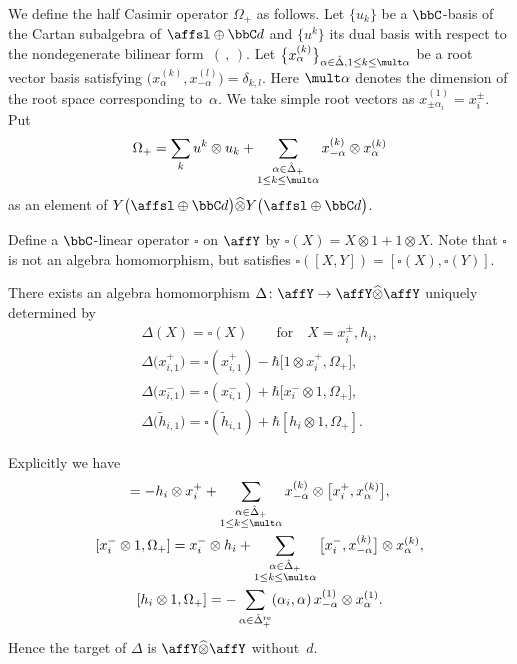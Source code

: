 We define the half Casimir operator $\Omega_+$ as follows. Let $\{u_k\}$ be a $\bbC$-basis of the Cartan subalgebra of $\affsl \oplus \bbC d$ and $\big\{u^k\big\}$ its dual basis with respect to the nondegenerate bilinear form~$(\, ,\, )$. Let $\big\{x_{\alpha}^{(k)}\big\}_{\alpha \in \hat{\Delta}, 1 \leq k \leq \mult \alpha}$ be a root vector basis satisfying $\big(x_{\alpha}^{(k)},x_{-\alpha}^{(l)}\big) = \delta_{k,l}$. Here $\mult \alpha$ denotes the dimension of the root space corresponding to~$\alpha$. We take simple root vectors as $x_{\pm \alpha_i}^{(1)} = x_i^{\pm}$. Put
\begin{gather*}
\Omega_+ = \sum_{k} u^k \otimes u_k + \sum_{\substack{\alpha \in \hat{\Delta}_+ \\ 1 \leq k \leq \mult \alpha}} x_{-\alpha}^{(k)} \otimes x_{\alpha}^{(k)}
\end{gather*}
as an element of $Y\big(\affsl \oplus \bbC d\big) \widehat{\otimes} Y\big(\affsl \oplus \bbC d\big)$.

Define a $\bbC$-linear operator $\square$ on $\affY$ by $\square(X) = X \otimes 1 + 1 \otimes X$. Note that $\square$ is not an algebra homomorphism, but satisfies $\square([X,Y]) = [\square(X), \square(Y)]$.
\begin{thm}\label{thm:definition_of_coproduct} There exists an algebra homomorphism $\Delta \colon \affY \to \affY \widehat{\otimes} \affY$ uniquely determined by
\begin{gather*}
\Delta(X) = \square(X) \qquad \text{for} \quad X=x_{i}^{\pm}, h_i,\\
\Delta\big(x_{i,1}^+\big) = \square(x_{i,1}^+) - \hbar \big[1 \otimes x_i^+, \Omega_+\big],\\
\Delta\big(x_{i,1}^-\big) = \square(x_{i,1}^-) + \hbar \big[x_i^- \otimes 1, \Omega_+\big],\\
\Delta\big(\tilde{h}_{i,1}\big)= \square(\tilde{h}_{i,1}) + \hbar [h_i \otimes 1, \Omega_+].
\end{gather*}
\end{thm}
\begin{rem}Explicitly we have
\begin{gather*}
[1 \otimes x_i^+, \Omega_+] = -h_i \otimes x_i^+ + \sum_{\substack{\alpha \in \hat{\Delta}_+\\ 1 \leq k \leq \mult \alpha}} x_{-\alpha}^{(k)} \otimes \big[x_i^+, x_{\alpha}^{(k)}\big],
\\
[x_i^- \otimes 1, \Omega_+] = x_i^- \otimes h_i + \sum_{\substack{\alpha \in \hat{\Delta}_+\\ 1 \leq k \leq \mult \alpha}} \big[x_i^-, x_{-\alpha}^{(k)}\big] \otimes x_{\alpha}^{(k)},
\\
[h_i \otimes 1, \Omega_+] = - \sum_{\alpha \in \hat{\Delta}_+^{\mathrm{re}}} (\alpha_i,\alpha)\, x_{-\alpha}^{(1)} \otimes x_{\alpha}^{(1)}.
\end{gather*}
Hence the target of $\Delta$ is $\affY \widehat{\otimes} \affY$ without~$d$.
\end{rem}

